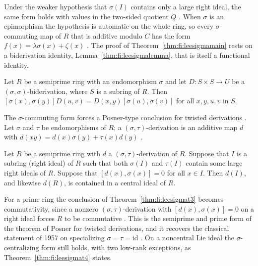 Under the weaker hypothesis that $\sigma(I)$ contains only a large right
ideal, the same form holds with values in the two-sided quotient $Q$
\cite[Theorem~1, p.~2947]{LeeTK2001SigmaCommuting}. When $\sigma$ is an
epimorphism the hypothesis is automatic on the whole ring, so every
$\sigma$-commuting map of $R$ that is additive modulo $C$ has the form
$f(x)=\lambda\sigma(x)+\zeta(x)$
\cite[Corollary~1, p.~2948]{LeeTK2001SigmaCommuting}. The proof of
Theorem~\ref{thm:fi:leesigmamain} rests on a biderivation identity,
Lemma~\ref{thm:fi:leesigmalemma}, that is itself a functional identity.

\begin{lemma}\label{thm:fi:leesigmalemma}
Let $R$ be a semiprime ring with an endomorphism $\sigma$ and let
$D\colon S\times S\to U$ be a $(\sigma,\sigma)$-biderivation, where $S$ is
a subring of $R$. Then $[\sigma(x),\sigma(y)]D(u,v)=D(x,y)[\sigma(u),\sigma(v)]$
for all $x,y,u,v$ in $S$.
\end{lemma}

The $\sigma$-commuting form forces a Posner-type conclusion for twisted
derivations \cite[Theorem~3, p.~2948]{LeeTK2001SigmaCommuting}. Let
$\sigma$ and $\tau$ be endomorphisms of $R$; a
$(\sigma,\tau)$-derivation is an additive map $d$ with
$d(xy)=d(x)\sigma(y)+\tau(x)d(y)$
\cite[p.~2948]{LeeTK2001SigmaCommuting}.

\begin{theorem}\label{thm:fi:leesigmat3}
Let $R$ be a semiprime ring with $d$ a $(\sigma,\tau)$-derivation of $R$.
Suppose that $I$ is a subring (right ideal) of $R$ such that both
$\sigma(I)$ and $\tau(I)$ contain some large right ideals of $R$. Suppose
that $[d(x),\sigma(x)]=0$ for all $x\in I$. Then $d(I)$, and likewise $d(R)$, is
contained in a central ideal of $R$.
\end{theorem}

For a prime ring the conclusion of Theorem~\ref{thm:fi:leesigmat3}
becomes commutativity, since a nonzero $(\sigma,\tau)$-derivation with
$[d(x),\sigma(x)]=0$ on a right ideal forces $R$ to be commutative
\cite[Corollary~4, p.~2950]{LeeTK2001SigmaCommuting}. This is the
semiprime and prime form of the theorem of Posner for twisted derivations, and
it recovers the classical statement of 1957 on specializing
$\sigma=\tau=\mathrm{id}$ \cite[p.~2946]{LeeTK2001SigmaCommuting}. On a
noncentral Lie ideal the $\sigma$-centralizing form still holds, with two
low-rank exceptions, as Theorem~\ref{thm:fi:leesigmat4} states.

